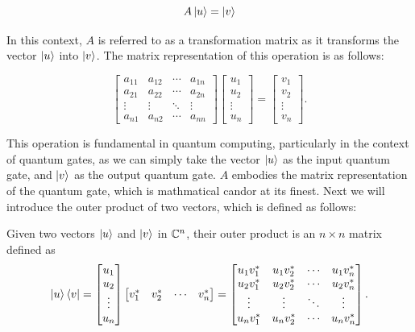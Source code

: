 \documentclass[12pt]{article}
\begin{document}
$$A \ket{u} = \ket{v}$$

In this context, $A$ is referred to as a transformation matrix as it transforms the vector $\ket{u}$ into $\ket{v}$. The matrix representation of this operation is as follows: 

\[
\begin{bmatrix}
a_{11} & a_{12} & \cdots & a_{1n} \\
a_{21} & a_{22} & \cdots & a_{2n} \\
\vdots & \vdots & \ddots & \vdots \\
a_{n1} & a_{n2} & \cdots & a_{nn}
\end{bmatrix}
\begin{bmatrix}
u_{1} \\
u_{2} \\
\vdots \\
u_{n}
\end{bmatrix}
=
\begin{bmatrix}
v_{1} \\
v_{2} \\
\vdots \\
v_{n}
\end{bmatrix}.
\]

This operation is fundamental in quantum computing, particularly in the context of quantum gates, as we can simply take the vector $\ket{u}$ as the input quantum gate, and $\ket{v}$ as the output quantum gate. $A$ embodies the matrix representation of the quantum gate, which is mathmatical candor at its finest. Next we will introduce the outer product of two vectors, which is defined as follows: 

\begin{definition}
    Given two vectors $\ket{u}$ and $\ket{v}$ in $\mathbb{C}^n$, their outer product is an $n \times n$ matrix defined as
    \[
        \ket{u}\bra{v}
        =
        \begin{bmatrix}
        u_{1} \\
        u_{2} \\
        \vdots \\
        u_{n}
        \end{bmatrix}
        \begin{bmatrix}
        v_{1}^{*} & v_{2}^{*} & \cdots & v_{n}^{*}
        \end{bmatrix}
        =
        \begin{bmatrix}
        u_{1} v_{1}^{*} & u_{1} v_{2}^{*} & \cdots & u_{1} v_{n}^{*} \\
        u_{2} v_{1}^{*} & u_{2} v_{2}^{*} & \cdots & u_{2} v_{n}^{*} \\
        \vdots          & \vdots          & \ddots & \vdots          \\
        u_{n} v_{1}^{*} & u_{n} v_{2}^{*} & \cdots & u_{n} v_{n}^{*}
        \end{bmatrix}.
    \]
\end{definition}
\end{document}
